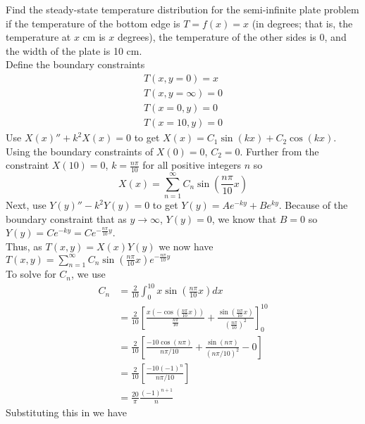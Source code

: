 \item [1.] Find the steady-state temperature distribution for the semi-infinite plate problem if the temperature of the bottom edge is $T= f (x) = x$ (in degrees; that is, the temperature at $x$ cm is $x$ degrees), the temperature of the other sides is 0\textdegree, and the width of the plate is 10 cm.\\[5mm]
Define the boundary constraints
\begin{align*}
    T(x,y=0)=x\\
    T(x,y=\infty)=0\\
    T(x=0,y)=0\\
    T(x=10,y)=0
\end{align*}
Use $X(x)''+k^2X(x) = 0$ to get $X(x) = C_1\sin(kx)+C_2\cos(kx)$. Using the boundary constraints of $X(0) = 0$, $C_2 = 0$. Further from the constraint $X(10) = 0$, $k = \frac{n\pi}{10}$ for all positive integers $n$ so 
\[\displaystyle X(x) = \sum_{n=1}^{\infty} C_n \sin\left(\frac{n\pi}{10} x\right)\]
Next, use $Y(y)''-k^2Y(y)=0$ to get $Y(y) = Ae^{-ky}+Be^{ky}$. Because of the boundary constraint that as $y \rightarrow \infty$, $Y(y) = 0$, we know that $B = 0$ so $Y(y) = Ce^{-ky} = Ce^{-\frac{n\pi}{10}y}$.\\[2mm]
Thus, as $T(x,y) = X(x)Y(y)$ we now have $\displaystyle T(x,y) = \sum_{n=1}^{\infty} C_n \sin\left(\frac{n\pi}{10} x\right) e^{-\frac{n\pi}{10} y}$\\[2mm]
To solve for $C_n$, we use \begin{align*}
    C_n &= \frac{2}{10} \int_0^{10} x \sin\left(\frac{n\pi}{10} x\right) dx \\
    &= \frac{2}{10} \left[ \frac{x(-\cos(\frac{n\pi}{10} x))}{\frac{n\pi}{10}} + \frac{\sin(\frac{n\pi}{10} x)}{(\frac{n\pi}{10})^2} \right]_{0}^{10}\\
    &= \frac{2}{10} \left[ \frac{-10\cos(n\pi)}{n\pi/10} + \frac{\sin(n\pi)}{(n\pi/10)^2} - 0 \right]\\
    &= \frac{2}{10} \left[ \frac{-10(-1)^n}{n\pi/10} \right]\\
    &= \frac{20}{\pi}\frac{(-1)^{n+1}}{n}
\end{align*}
Substituting this in we have
\answer{\[
    T(x,y) = \frac{20}{\pi}\sum_{n=1}^{\infty} \frac{(-1)^{n+1}}{n} \sin\left(\frac{n\pi}{10} x\right) e^{-\frac{n\pi}{10} y}
\]}
